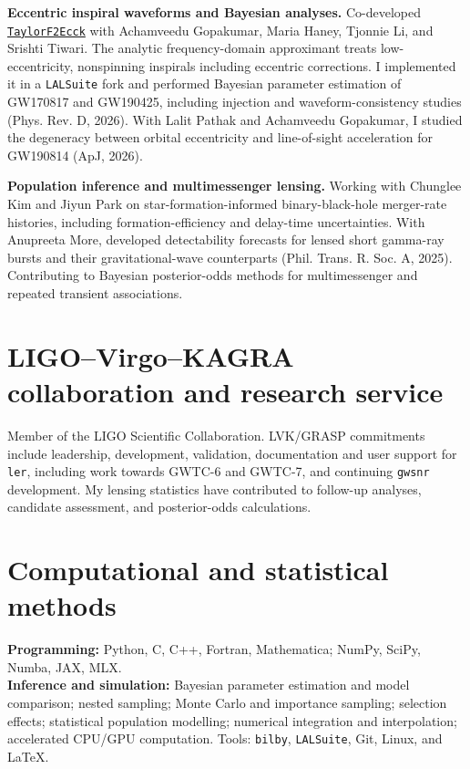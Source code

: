 \documentclass[10pt]{article}
\begin{document}
\textbf{Eccentric inspiral waveforms and Bayesian analyses.} Co-developed \href{https://arxiv.org/abs/2508.12697}{\texttt{TaylorF2Ecck}} with Achamveedu Gopakumar, Maria Haney, Tjonnie Li, and Srishti Tiwari. The analytic frequency-domain approximant treats low-eccentricity, nonspinning inspirals including eccentric corrections. I implemented it in a \texttt{LALSuite} fork and performed Bayesian parameter estimation of GW170817 and GW190425, including injection and waveform-consistency studies (Phys. Rev. D, 2026). With Lalit Pathak and Achamveedu Gopakumar, I studied the degeneracy between orbital eccentricity and line-of-sight acceleration for GW190814 (ApJ, 2026).

\textbf{Population inference and multimessenger lensing.} Working with Chunglee Kim and Jiyun Park on star-formation-informed binary-black-hole merger-rate histories, including formation-efficiency and delay-time uncertainties. With Anupreeta More, developed detectability forecasts for lensed short gamma-ray bursts and their gravitational-wave counterparts (Phil. Trans. R. Soc. A, 2025). Contributing to Bayesian posterior-odds methods for multimessenger and repeated transient associations.
\section*{LIGO--Virgo--KAGRA collaboration and research service}
Member of the LIGO Scientific Collaboration. LVK/GRASP commitments include leadership, development, validation, documentation and user support for \texttt{ler}, including work towards GWTC-6 and GWTC-7, and continuing \texttt{gwsnr} development. My lensing statistics have contributed to follow-up analyses, candidate assessment, and posterior-odds calculations.
\section*{Computational and statistical methods}
\textbf{Programming:} Python, C, C++, Fortran, Mathematica; NumPy, SciPy, Numba, JAX, MLX.\\
\textbf{Inference and simulation:} Bayesian parameter estimation and model comparison; nested sampling; Monte Carlo and importance sampling; selection effects; statistical population modelling; numerical integration and interpolation; accelerated CPU/GPU computation. Tools: \texttt{bilby}, \texttt{LALSuite}, Git, Linux, and \LaTeX.
\newpage
\end{document}
